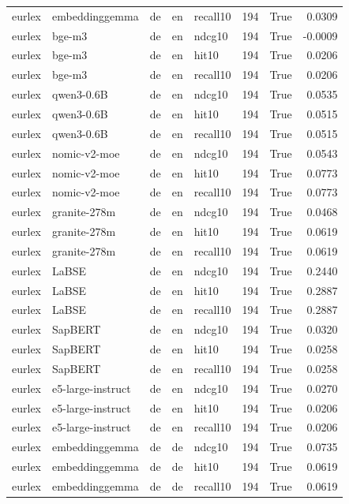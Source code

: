 \begin{tabular}{lllllrrr}
eurlex & embeddinggemma & de & en & recall10 & 194 & True & 0.0309 \\
eurlex & bge-m3 & de & en & ndcg10 & 194 & True & -0.0009 \\
eurlex & bge-m3 & de & en & hit10 & 194 & True & 0.0206 \\
eurlex & bge-m3 & de & en & recall10 & 194 & True & 0.0206 \\
eurlex & qwen3-0.6B & de & en & ndcg10 & 194 & True & 0.0535 \\
eurlex & qwen3-0.6B & de & en & hit10 & 194 & True & 0.0515 \\
eurlex & qwen3-0.6B & de & en & recall10 & 194 & True & 0.0515 \\
eurlex & nomic-v2-moe & de & en & ndcg10 & 194 & True & 0.0543 \\
eurlex & nomic-v2-moe & de & en & hit10 & 194 & True & 0.0773 \\
eurlex & nomic-v2-moe & de & en & recall10 & 194 & True & 0.0773 \\
eurlex & granite-278m & de & en & ndcg10 & 194 & True & 0.0468 \\
eurlex & granite-278m & de & en & hit10 & 194 & True & 0.0619 \\
eurlex & granite-278m & de & en & recall10 & 194 & True & 0.0619 \\
eurlex & LaBSE & de & en & ndcg10 & 194 & True & 0.2440 \\
eurlex & LaBSE & de & en & hit10 & 194 & True & 0.2887 \\
eurlex & LaBSE & de & en & recall10 & 194 & True & 0.2887 \\
eurlex & SapBERT & de & en & ndcg10 & 194 & True & 0.0320 \\
eurlex & SapBERT & de & en & hit10 & 194 & True & 0.0258 \\
eurlex & SapBERT & de & en & recall10 & 194 & True & 0.0258 \\
eurlex & e5-large-instruct & de & en & ndcg10 & 194 & True & 0.0270 \\
eurlex & e5-large-instruct & de & en & hit10 & 194 & True & 0.0206 \\
eurlex & e5-large-instruct & de & en & recall10 & 194 & True & 0.0206 \\
eurlex & embeddinggemma & de & de & ndcg10 & 194 & True & 0.0735 \\
eurlex & embeddinggemma & de & de & hit10 & 194 & True & 0.0619 \\
eurlex & embeddinggemma & de & de & recall10 & 194 & True & 0.0619 \\

\end{tabular}

